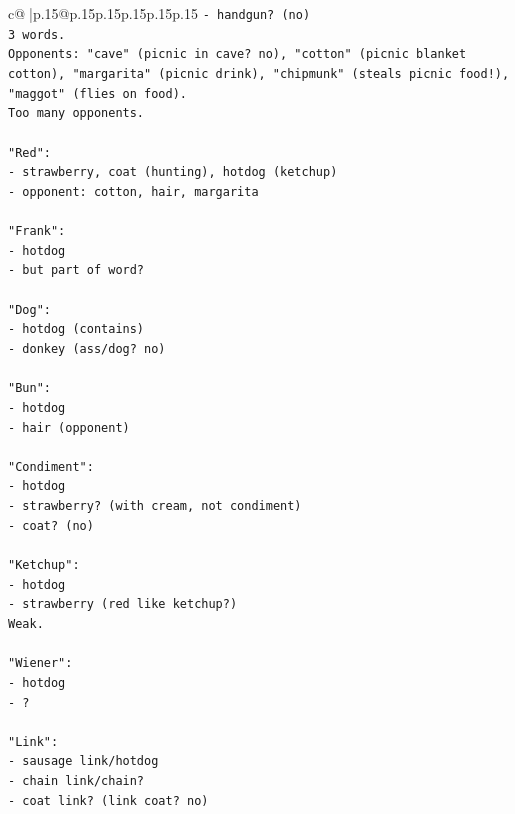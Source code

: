 \documentclass{article}
\begin{document}
{\begin{supertabular}{c@{$\;$}|p{.15\linewidth}@{}p{.15\linewidth}p{.15\linewidth}p{.15\linewidth}p{.15\linewidth}p{.15\linewidth}}
{{{\texttt{{-} handgun? (no)} \\
\texttt{3 words.} \\
\texttt{Opponents: "cave" (picnic in cave? no), "cotton" (picnic blanket cotton), "margarita" (picnic drink), "chipmunk" (steals picnic food!), "maggot" (flies on food).} \\
\texttt{Too many opponents.} \\
\\ 
\texttt{"Red":} \\
\texttt{{-} strawberry, coat (hunting), hotdog (ketchup)} \\
\texttt{{-} opponent: cotton, hair, margarita} \\
\\ 
\texttt{"Frank":} \\
\texttt{{-} hotdog} \\
\texttt{{-} but part of word?} \\
\\ 
\texttt{"Dog":} \\
\texttt{{-} hotdog (contains)} \\
\texttt{{-} donkey (ass/dog? no)} \\
\\ 
\texttt{"Bun":} \\
\texttt{{-} hotdog} \\
\texttt{{-} hair (opponent)} \\
\\ 
\texttt{"Condiment":} \\
\texttt{{-} hotdog} \\
\texttt{{-} strawberry? (with cream, not condiment)} \\
\texttt{{-} coat? (no)} \\
\\ 
\texttt{"Ketchup":} \\
\texttt{{-} hotdog} \\
\texttt{{-} strawberry (red like ketchup?)} \\
\texttt{Weak.} \\
\\ 
\texttt{"Wiener":} \\
\texttt{{-} hotdog} \\
\texttt{{-} ?} \\
\\ 
\texttt{"Link":} \\
\texttt{{-} sausage link/hotdog} \\
\texttt{{-} chain link/chain?} \\
\texttt{{-} coat link? (link coat? no)} \\
}}}
\end{supertabular}}
\end{document}

